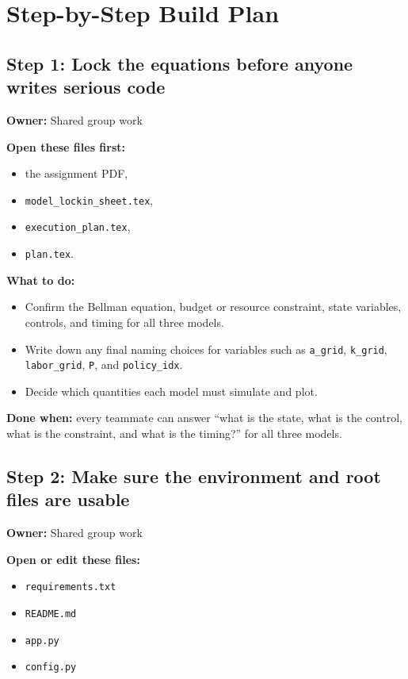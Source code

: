 \documentclass[11pt]{article}
\begin{document}
\section{Step-by-Step Build Plan}

\subsection{Step 1: Lock the equations before anyone writes serious code}
\textbf{Owner:} Shared group work

\textbf{Open these files first:}
\begin{itemize}
    \item the assignment PDF,
    \item \texttt{model\_lockin\_sheet.tex},
    \item \texttt{execution\_plan.tex},
    \item \texttt{plan.tex}.
\end{itemize}

\textbf{What to do:}
\begin{itemize}
    \item Confirm the Bellman equation, budget or resource constraint, state variables, controls, and timing for all three models.
    \item Write down any final naming choices for variables such as \texttt{a\_grid}, \texttt{k\_grid}, \texttt{labor\_grid}, \texttt{P}, and \texttt{policy\_idx}.
    \item Decide which quantities each model must simulate and plot.
\end{itemize}

\textbf{Done when:} every teammate can answer ``what is the state, what is the control, what is the constraint, and what is the timing?'' for all three models.

\subsection{Step 2: Make sure the environment and root files are usable}
\textbf{Owner:} Shared group work

\textbf{Open or edit these files:}
\begin{itemize}
    \item \texttt{requirements.txt}
    \item \texttt{README.md}
    \item \texttt{app.py}
    \item \texttt{config.py}
\end{itemize}
\end{document}
